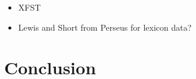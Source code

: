 \documentclass{article}
\begin{document}
\begin{itemize}
    \item XFST \cite{xfst}
    \item Lewis and Short from Perseus for lexicon data? %
\end{itemize}

\section{Conclusion} %

{}
\end{document}
